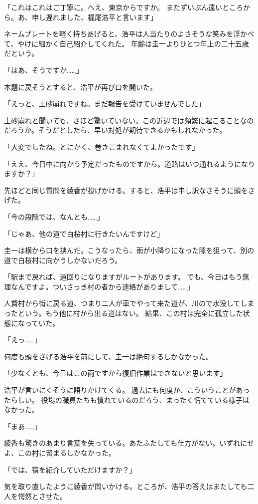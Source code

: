 ﻿\documentclass[
    book,tate,
    line_length=30zw,
    jafontsize=12pt,
    paper=b5j,
    landscape,
    ]{jlreq}
\begin{document}
「これはこれはご丁寧に。へえ、東京からですか。 またずいぶん遠いところから。あ、申し遅れました、梶尾浩平と言います」

ネームプレートを軽く持ちあげると、浩平は人当たりのよさそうな笑みを浮かべて、やけに細かく自己紹介してくれた。 年齢は圭一よりひとつ年上の二十五歳だという。

「はあ、そうですか……」

本題に戻そうとすると、浩平が再び口を開いた。

「えっと、土砂崩れですね。まだ報告を受けていませんでした」

土砂崩れと聞いても、さほど驚いていない。この近辺では頻繁に起こることなのだろうか。そうだとしたら、早い対処が期待できるかもしれなかった。

「大変でしたね。とにかく、巻きこまれなくてよかったです」

「ええ、今日中に向かう予定だったものですから。道路はいつ通れるようになりますか？」

先ほどと同じ質問を綾香が投げかける。すると、浩平は申し訳なさそうに頭をさげた。

「今の段階では、なんとも……」

「じゃあ、他の道で白桜村に行きたいんですけど」

圭一は横から口を挟んだ。こうなったら、雨が小降りになった隙を狙って、別の道で白桜村に向かうしかないだろう。

「駅まで戻れば、遠回りになりますがルートがあります。
でも、今日はもう無理なんですよ。ついさっき村の者から連絡がありまして……」

人贄村から街に戻る道、つまり二人が車でやって来た道が、川ので水没してしまったという。もう他に村から出る道はない。
結果、この村は完全に孤立した状態になっていた。

「えっ……」

何度も頭をさげる浩平を前にして、圭一は絶句するしかなかった。

「少なくとも、今日はこの雨ですから復旧作業はできないと思います」

浩平が言いにくそうに語りかけてくる。 過去にも何度か、こういうことがあったらしい。
役場の職員たちも慣れているのだろう、まったく慌てている様子はなかった。

「まあ……」

綾香も驚きのあまり言葉を失っている。あたふたしても仕方がない。いずれにせよ、この村に留まるしかなかった。

「では、宿を紹介していただけますか？」

気を取り直したように綾香が問いかける。ところが、浩平の答えはまたしても二人を愕然とさせた。
\end{document}
